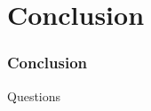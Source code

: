 \documentclass{beamer}
\begin{document}
\section{Conclusion}
\begin{frame}
\frametitle{Conclusion}

\end{frame}


\begin{frame}
\Huge{\centerline{Questions}}
\end{frame}
\end{document}
